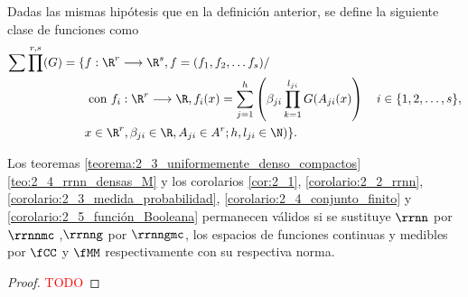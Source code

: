 \begin{definicion} 
    Dadas las mismas hipótesis que en la definición anterior, se define la siguiente clase de funciones como 
    \begin{equation}
        \begin{split}
            \sum \prod^{r, s}(G) 
            = 
        \{ 
            & f: \R ^r \longrightarrow \R^s, f= (f_1, f_2, \ldots f_s)  / \quad 
            \\ &
            \text{ con } f_i : \R ^r\longrightarrow \R, 
            f_i(x)=\sum_{j = 1} ^h 
            \left(
            \beta_{j i} \prod_{k=1}^{l_{j i}} G(A_{j i}(x)
            \right)
             \quad i \in \{1,2,\ldots, s\}, \\
            & x  \in \R ^r, \beta_{j i} \in \R, A_{j i}\in A^r; h,l_{j i} \in \N
            )
        \}.
        \end{split}
    \end{equation}
\end{definicion}

\begin{corolario}\label{corolario:2_6}
    Los teoremas 
    \ref{teorema:2_3_uniformemente_denso_compactos}
    \ref{teo:2_4_rrnn_densas_M} 
    y los corolarios
    \ref{cor:2_1}, 
    \ref{corolario:2_2_rrnn},
    \ref{corolario:2_3_medida_probabilidad},
    \ref{corolario:2_4_conjunto_finito}
    y 
    \ref{corolario:2_5_función_Booleana}
    permanecen válidos si se sustituye $\rrnn$ por $\rrnnmc$
    ,$\rrnng$ por $\rrnngmc$, 
    los espacios de funciones continuas y medibles por $\fCC$ y $\fMM$ respectivamente con su respectiva norma.
\end{corolario}
\begin{proof}
    \textcolor{red}{TODO}
\end{proof}

